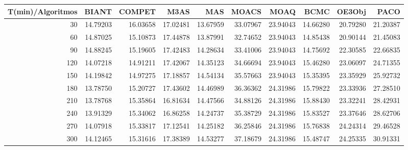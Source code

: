 \begin{table}[h]
    \centering
    \begin{tabular}{|r|r|r|r|r|r|r|r|r|r|}
        \hline \tiny T(min)/Algoritmos & \tiny {BIANT} & \tiny {COMPET} & \tiny {M3AS} & \tiny
        {MAS} & \tiny {MOACS} & \tiny {MOAQ} & \tiny {BCMC} & \tiny {OE3Obj} & \tiny {PACO} \\
        \hline \tiny 30 &{\tiny 14.79203}&{\tiny 16.03658}&{\tiny 17.02481}&{\tiny 13.67959}&{\tiny
        33.07967}&{\tiny 23.94043}&{\tiny 14.66280}&{\tiny 20.79280} &{\tiny 21.20387} \\
        \hline \tiny 60 &{\tiny 14.87025}&{ \tiny 15.10873}&{\tiny 17.44878}&{\tiny
        13.87991}&{\tiny 32.74652}&{\tiny 23.94043}&{\tiny 14.85438}&{\tiny 20.90144} &{\tiny 21.45083} \\
        \hline \tiny 90 &{\tiny 14.88245}&{\tiny 15.19605}&{\tiny 17.42483}&{\tiny 14.28634}&{\tiny
        33.41006}&{\tiny 23.94043}&{\tiny 14.75692}&{\tiny 22.30585} &{\tiny 22.66835} \\
        \hline \tiny 120 &{\tiny 14.07218}&{\tiny 14.91211}&{\tiny 17.42067}&{\tiny
        14.35123}&{\tiny 34.66694}&{\tiny 23.94043}&{\tiny 15.46280}&{\tiny 23.06097} &{\tiny 24.71355} \\
        \hline \tiny 150 &{\tiny 14.19842}&{\tiny 14.97275}&{\tiny 17.18857}&{\tiny
        14.54134}&{\tiny 35.57663}&{\tiny 23.94043}&{\tiny 15.35395}&{\tiny 23.35929} &{\tiny 25.92732} \\
        \hline \tiny 180 &{\tiny 13.78750}&{\tiny 15.20727}&{\tiny 17.43602}&{\tiny
        14.46989}&{\tiny 36.36362}&{\tiny 24.31986}&{\tiny 15.79822}&{\tiny 23.33936} &{\tiny 27.28510} \\
        \hline \tiny 210 &{\tiny 13.78768}&{\tiny 15.35864}&{\tiny 16.81634}&{\tiny
        14.47566}&{\tiny 34.88126}&{\tiny 24.31986}&{\tiny 15.88430}&{\tiny 23.32241} &{\tiny 28.42931} \\
        \hline \tiny 240 &{\tiny 13.91329}&{\tiny 15.34062}&{\tiny 16.86258}&{\tiny
        14.24737}&{\tiny 35.38729}&{\tiny 24.31986}&{\tiny 15.83527}&{\tiny 23.37646} &{\tiny 28.62706} \\
        \hline \tiny 270 &{\tiny 14.07918}&{\tiny 15.33817}&{\tiny 17.12541}&{\tiny
        14.25182}&{\tiny 36.25846}&{\tiny 24.31986}&{\tiny 15.76838}&{\tiny 24.24314} &{\tiny 29.46528} \\
        \hline \tiny 300 &{\tiny 14.12465}&{\tiny 15.31616}&{\tiny 17.38389}&{\tiny
        14.53277}&{\tiny 37.18679}&{\tiny 24.31986}&{\tiny 15.48747}&{\tiny 24.25335} &{\tiny 30.91331} \\

\end{tabular}
\end{table}
